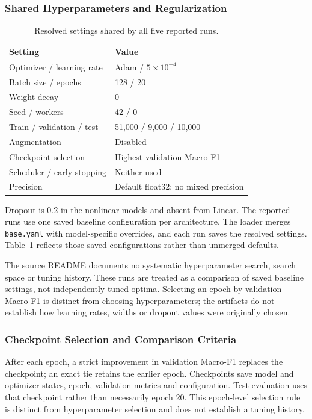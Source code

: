 \subsubsection{Shared Hyperparameters and Regularization}
\begin{table}[!htbp]\centering
\caption{Resolved settings shared by all five reported runs.}
\label{tab:training}
\begin{tabularx}{\linewidth}{@{}lX@{}}\toprule
Setting & Value\\\midrule
Optimizer / learning rate & Adam / $5\times10^{-4}$\\
Batch size / epochs & 128 / 20\\
Weight decay & 0\\
Seed / workers & 42 / 0\\
Train / validation / test & 51,000 / 9,000 / 10,000\\
Augmentation & Disabled\\
Checkpoint selection & Highest validation Macro-F1\\
Scheduler / early stopping & Neither used\\
Precision & Default float32; no mixed precision\\\bottomrule
\end{tabularx}\end{table}
Dropout is 0.2 in the nonlinear models and absent from Linear. The reported runs use one saved baseline configuration per architecture. The loader merges \texttt{base.yaml} with model-specific overrides, and each run saves the resolved settings. Table~\ref{tab:training} reflects those saved configurations rather than unmerged defaults.

The source README documents no systematic hyperparameter search, search space or tuning history. These runs are treated as a comparison of saved baseline settings, not independently tuned optima. Selecting an epoch by validation Macro-F1 is distinct from choosing hyperparameters; the artifacts do not establish how learning rates, widths or dropout values were originally chosen.

\subsubsection{Checkpoint Selection and Comparison Criteria}
After each epoch, a strict improvement in validation Macro-F1 replaces the checkpoint; an exact tie retains the earlier epoch. Checkpoints save model and optimizer states, epoch, validation metrics and configuration. Test evaluation uses that checkpoint rather than necessarily epoch 20. This epoch-level selection rule is distinct from hyperparameter selection and does not establish a tuning history.

